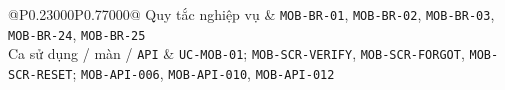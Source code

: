 \begin{longtable}{@{}P{0.23000\SRSWidth}P{0.77000\SRSWidth}@{}}
Quy tắc nghiệp vụ & \texttt{MOB-\allowbreak{}BR-\allowbreak{}01}, \texttt{MOB-\allowbreak{}BR-\allowbreak{}02}, \texttt{MOB-\allowbreak{}BR-\allowbreak{}03}, \texttt{MOB-\allowbreak{}BR-\allowbreak{}24}, \texttt{MOB-\allowbreak{}BR-\allowbreak{}25} \\[3pt]
Ca sử dụng /\allowbreak{} màn /\allowbreak{} \texttt{API} & \texttt{UC-\allowbreak{}MOB-\allowbreak{}01}; \texttt{MOB-\allowbreak{}SCR-\allowbreak{}VERIFY}, \texttt{MOB-\allowbreak{}SCR-\allowbreak{}FORGOT}, \texttt{MOB-\allowbreak{}SCR-\allowbreak{}RESET}; \texttt{MOB-\allowbreak{}API-\allowbreak{}006}, \texttt{MOB-\allowbreak{}API-\allowbreak{}010}, \texttt{MOB-\allowbreak{}API-\allowbreak{}012} \\[3pt]
\end{longtable}
\endgroup

